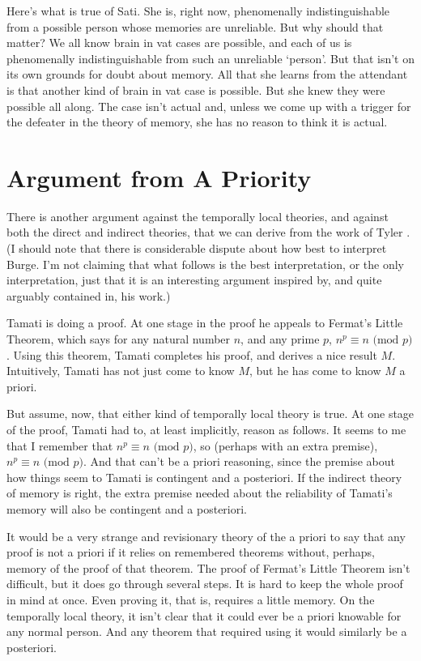 Here's what is true of Sati. She is, right now, phenomenally indistinguishable from a possible person whose memories are unreliable. But why should that matter? We all know brain in vat cases are possible, and each of us is phenomenally indistinguishable from such an unreliable `person'. But that isn't on its own grounds for doubt about memory. All that she learns from the attendant is that another kind of brain in vat case is possible. But she knew they were possible all along. The case isn't actual and, unless we come up with a trigger for the defeater in the theory of memory, she has no reason to think it is actual.

\section{Argument from A Priority}
\label{argumentfromapriority}

There is another argument against the temporally local theories, and against both the direct and indirect theories, that we can derive from the work of Tyler  \citet{Burge1993, Burge1997}. (I should note that there is considerable dispute about how best to interpret Burge. I'm not claiming that what follows is the best interpretation, or the only interpretation, just that it is an interesting argument inspired by, and quite arguably contained in, his work.)

Tamati is doing a proof. At one stage in the proof he appeals to Fermat's Little Theorem, which says for any natural number $n$, and any prime $p$, $n^p \equiv n \text{ (mod } p)$. Using this theorem, Tamati completes his proof, and derives a nice result $M$. Intuitively, Tamati has not just come to know $M$, but he has come to know $M$ a priori.

But assume, now, that either kind of temporally local theory is true. At one stage of the proof, Tamati had to, at least implicitly, reason as follows. It seems to me that I remember that $n^p \equiv n \text{ (mod } p)$, so (perhaps with an extra premise), $n^p \equiv n \text{ (mod } p)$. And that can't be a priori reasoning, since the premise about how things seem to Tamati is contingent and a posteriori. If the indirect theory of memory is right, the extra premise needed about the reliability of Tamati's memory will also be contingent and a posteriori.

It would be a very strange and revisionary theory of the a priori to say that any proof is not a priori if it relies on remembered theorems without, perhaps, memory of the proof of that theorem. The proof of Fermat's Little Theorem isn't difficult, but it does go through several steps. It is hard to keep the whole proof in mind at once. Even proving it, that is, requires a little memory. On the temporally local theory, it isn't clear that it could ever be a priori knowable for any normal person. And any theorem that required using it would similarly be a posteriori.

